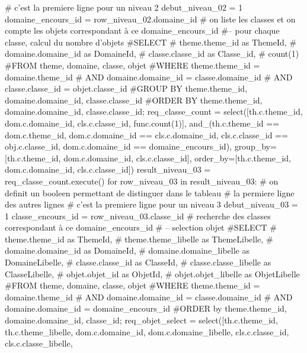 \documentclass[12pt,titlepage]{book}
\begin{document}
\begin{lbdpython}
      # c'est la premiere ligne pour un niveau 2
      debut_niveau_02 = 1
      domaine_encours_id = row_niveau_02.domaine_id
      # on liste les classes et on compte les objets correspondant à ce domaine_encours_id
      #-- pour chaque classe, calcul du nombre d'objets
      #SELECT
      #   theme.theme_id as ThemeId,
      #   domaine.domaine_id as DomaineId,
      #   classe.classe_id as Classe_id,
      #   count(1)
      #FROM theme, domaine, classe, objet
      #WHERE theme.theme_id = domaine.theme_id 
      #  AND domaine.domaine_id = classe.domaine_id
      #  AND classe.classe_id = objet.classe_id
      #GROUP BY theme.theme_id, domaine.domaine_id, classe.classe_id
      #ORDER BY theme.theme_id, domaine.domaine_id, classe.classe_id;
      req_classe_count = select([th.c.theme_id, dom.c.domaine_id,
                                 cls.c.classe_id, func.count(1)],
                         and_(th.c.theme_id == dom.c.theme_id,
                              dom.c.domaine_id == cls.c.domaine_id,
                              cls.c.classe_id == obj.c.classe_id,
                              dom.c.domaine_id == domaine_encours_id),
                         group_by=[th.c.theme_id, dom.c.domaine_id, cls.c.classe_id],
                         order_by=[th.c.theme_id, dom.c.domaine_id, cls.c.classe_id])
      result_niveau_03 = req_classe_count.execute()
      for row_niveau_03 in result_niveau_03:
         # on definit un booleen permettant de distinguer dans le tableau
         # la permiere ligne des autres lignes
         # c'est la premiere ligne pour un niveau 3
         debut_niveau_03 = 1
         classe_encours_id = row_niveau_03.classe_id
         # recherche des classes correspondant à ce domaine_encours_id
         # -- selection objet
         #SELECT
         #   theme.theme_id as ThemeId,
         #   theme.theme_libelle as ThemeLibelle,
         #   domaine.domaine_id as DomaineId,
         #   domaine.domaine_libelle as DomaineLibelle,
         #   classe.classe_id as ClasseId,
         #   classe.classe_libelle as ClasseLibelle,
         #   objet.objet_id as ObjetId,
         #   objet.objet_libelle as ObjetLibelle
         #FROM theme, domaine, classe, objet
         #WHERE theme.theme_id = domaine.theme_id
         #  AND domaine.domaine_id = classe.domaine_id
         #  AND domaine.domaine_id = domaine_encours_id
         #ORDER by theme.theme_id, domaine.domaine_id, classe_id;
         req_objet_select = select([th.c.theme_id, th.c.theme_libelle,
                                    dom.c.domaine_id, dom.c.domaine_libelle,
                                    cls.c.classe_id, cls.c.classe_libelle,

\end{lbdpython}
\end{document}
